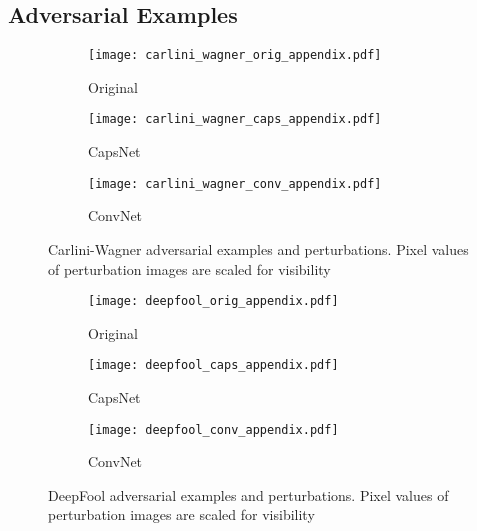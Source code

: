 \subsection{Adversarial Examples}

\begin{figure}
	\centering
	
	\begin{subfigure}{.23\textwidth}
		\centering
		\texttt{[image: carlini\_wagner\_orig\_appendix.pdf]}%
		\caption{Original}%
	\end{subfigure}%
	\begin{subfigure}{.36\textwidth}
		\centering
		\texttt{[image: carlini\_wagner\_caps\_appendix.pdf]}%
		\caption{CapsNet}
	\end{subfigure}%
	\begin{subfigure}{.36\textwidth}
		\centering
		\texttt{[image: carlini\_wagner\_conv\_appendix.pdf]}%
		\caption{ConvNet}
	\end{subfigure}
	\caption[Carlini-Wagner Adversarial Examples]{Carlini-Wagner adversarial examples and perturbations. Pixel values of perturbation images are scaled for visibility}
	\label{fig:carlini-wagner-img}
	
\end{figure}


\begin{figure}
	\centering
	
	\begin{subfigure}{.23\textwidth}
		\centering
		\texttt{[image: deepfool\_orig\_appendix.pdf]}%
		\caption{Original}%
	\end{subfigure}%
	\begin{subfigure}{.36\textwidth}
		\centering
		\texttt{[image: deepfool\_caps\_appendix.pdf]}%
		\caption{CapsNet}
	\end{subfigure}%
	\begin{subfigure}{.36\textwidth}
		\centering
		\texttt{[image: deepfool\_conv\_appendix.pdf]}%
		\caption{ConvNet}
	\end{subfigure}
	\caption[DeepFool Adversarial Examples]{DeepFool adversarial examples and perturbations. Pixel values of perturbation images are scaled for visibility}
	\label{fig:deepfool-img}
	
\end{figure}

